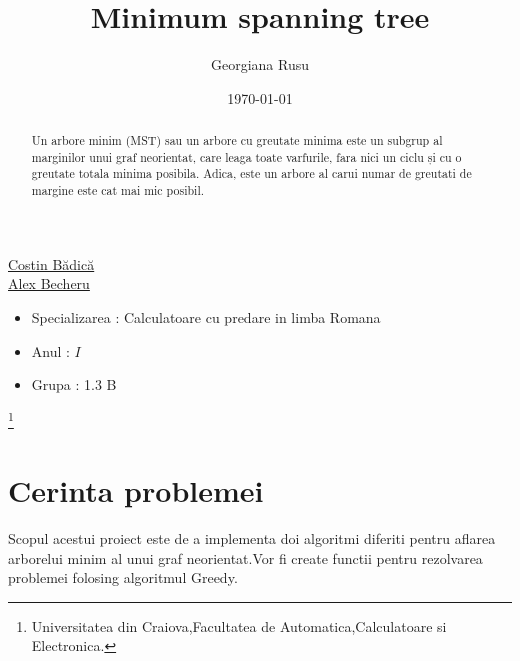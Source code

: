 \documentclass[12pt]{article}
\begin{document}

\title{Minimum spanning tree \\}
\author{Georgiana Rusu}
\date{\today}
\maketitle

\begin{tabbing}
  \=\href{http://software.ucv.ro/~cbadica}{Costin B\u{a}dic\u{a}} \\
  \=\href{http://www.becheru.net/}{Alex Becheru} \\
\end{tabbing}


\begin{abstract}
Un arbore minim (MST) sau un arbore cu greutate minima este un subgrup al marginilor unui graf neorientat, care leaga toate varfurile, fara nici un ciclu și cu o greutate totala minima posibila. Adica, este un arbore  al carui numar de greutati de margine este cat mai mic posibil. 
\end{abstract}

\begin{quote}
\end{quote}

\begin{itemize}
  \item Specializarea : Calculatoare cu predare in limba Romana
  \item Anul : $I$
  \item Grupa : 1.3 B
\end{itemize}

\vfill

\thanks{Universitatea din Craiova,Facultatea de Automatica,Calculatoare si Electronica.}

\pagebreak


\section{Cerinta problemei}
Scopul acestui proiect este de a implementa doi algoritmi diferiti pentru aflarea arborelui minim al unui graf neorientat.Vor fi create functii pentru rezolvarea problemei folosing algoritmul Greedy.
\end{document}
